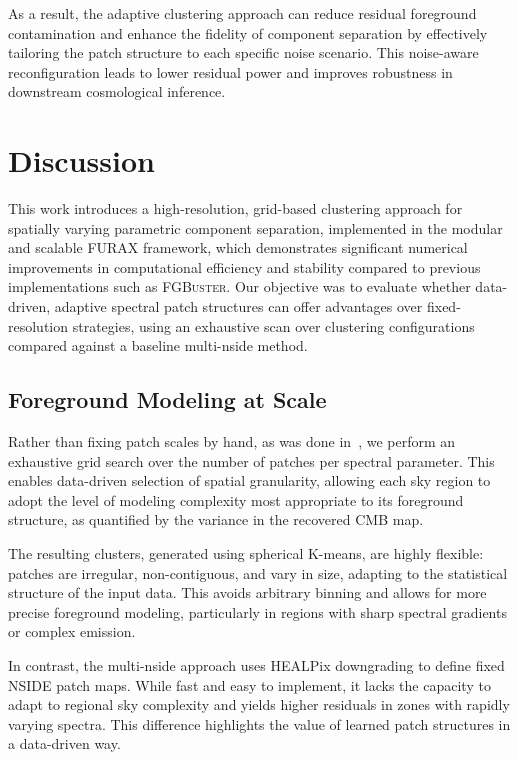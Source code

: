 \documentclass[fleqn,usenatbib]{mnras}
\begin{document}
As a result, the adaptive clustering approach can reduce residual foreground contamination and enhance the fidelity of component separation by effectively tailoring the patch structure to each specific noise scenario. This noise-aware reconfiguration leads to lower residual power and improves robustness in downstream cosmological inference.


\section{Discussion}
\label{sec:discussion}

This work introduces a high-resolution, grid-based clustering approach for spatially varying parametric component separation, implemented in the modular and scalable \textsc{FURAX} framework, which demonstrates significant numerical improvements in computational efficiency and stability compared to previous implementations such as \textsc{FGBuster}. Our objective was to evaluate whether data-driven, adaptive spectral patch structures can offer advantages over fixed-resolution strategies, using an exhaustive scan over clustering configurations compared against a baseline multi-nside method.

\subsection*{Foreground Modeling at Scale}

Rather than fixing patch scales by hand, as was done in~\citep{LiteBIRD_PTEP_2022}, we perform an exhaustive grid search over the number of patches per spectral parameter. This enables data-driven selection of spatial granularity, allowing each sky region to adopt the level of modeling complexity most appropriate to its foreground structure, as quantified by the variance in the recovered CMB map.

The resulting clusters, generated using spherical K-means, are highly flexible: patches are irregular, non-contiguous, and vary in size, adapting to the statistical structure of the input data. This avoids arbitrary binning and allows for more precise foreground modeling, particularly in regions with sharp spectral gradients or complex emission.

In contrast, the multi-nside approach uses HEALPix downgrading to define fixed NSIDE patch maps. While fast and easy to implement, it lacks the capacity to adapt to regional sky complexity and yields higher residuals in zones with rapidly varying spectra. This difference highlights the value of learned patch structures in a data-driven way.
\end{document}
